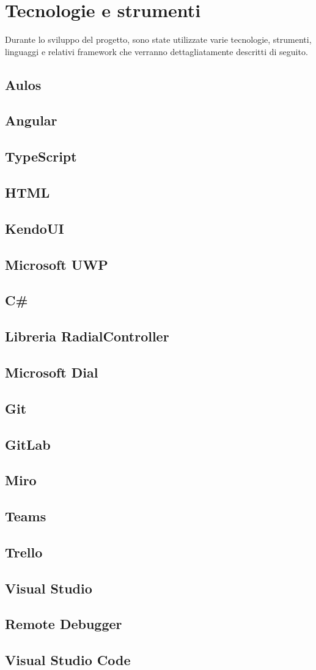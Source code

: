 \chapter{Tecnologie e strumenti}
\label{chap:tecno}

Durante lo sviluppo del progetto, sono state utilizzate varie tecnologie, strumenti, linguaggi e relativi framework che verranno dettagliatamente descritti di seguito.

\section{Aulos}
\section{Angular}
\section{TypeScript}
\section{HTML}
\section{KendoUI}
\section{Microsoft UWP}
\section{C\#}
\section{Libreria RadialController}
\section{Microsoft Dial}
\section{Git}
\section{GitLab}
\section{Miro}
\section{Teams}
\section{Trello}
\section{Visual Studio}
\section{Remote Debugger}
\section{Visual Studio Code}